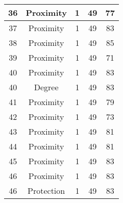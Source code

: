 \documentclass[results.tex]{subfiles}
\begin{document}
\begin{center}
\begin{tabular}{| c || c | c | c | c |}
            \hline
            36                      & Proximity                    & 1                      & 49                      & 77                   \\
            \hline
            37                      & Proximity                    & 1                      & 49                      & 83                   \\
            \hline
            38                      & Proximity                    & 1                      & 49                      & 85                   \\
            \hline
            39                      & Proximity                    & 1                      & 49                      & 71                   \\
            \hline
            40                      & Proximity                    & 1                      & 49                      & 83                   \\
            \hline
            40                      & Degree                       & 1                      & 49                      & 83                   \\
            \hline
            41                      & Proximity                    & 1                      & 49                      & 79                   \\
            \hline
            42                      & Proximity                    & 1                      & 49                      & 73                   \\
            \hline
            43                      & Proximity                    & 1                      & 49                      & 81                   \\
            \hline
            44                      & Proximity                    & 1                      & 49                      & 81                   \\
            \hline
            45                      & Proximity                    & 1                      & 49                      & 83                   \\
            \hline
            46                      & Proximity                    & 1                      & 49                      & 83                   \\
            \hline
            46                      & Protection                   & 1                      & 49                      & 83                   \\

\end{tabular}
\end{center}
\end{document}
